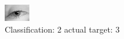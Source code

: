 \begin{figure}[h!]
\begin{center}
\includegraphics[width=0.60\columnwidth]{figures/ID2879_class_2_target_3.png}
\end{center}
\caption{ Classification: 2 actual target: 3}
\label{fig:ID2879_class_2_target_3}
\end{figure}
